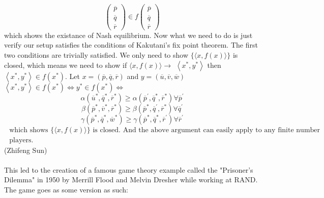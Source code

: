 \documentclass[12pt]{article}
\begin{document}
 	\[\left( \begin{array} { c } { \overline { p } } \\ { \overline { q } } \\ { \overline { r } } \end{array} \right) \in f \left( \begin{array} { c } { \overline { p } } \\ { \overline { q } } \\ { \overline { r } } \end{array} \right)\]
 	which shows the existance of Nash equilibrium. Now what we need to do is just verify our setup
 	satisfies the conditions of Kakutani's fix point theorem. The first two conditions are trivially
 	satisfied. We only need to show $\{ \langle x , f ( x ) \rangle \}$ is closed, which means we need to show if $\langle x , f ( x ) \rangle \rightarrow$ $\left\langle x ^ { * } , y ^ { * } \right\rangle$ then $\left\langle x ^ { * } , y ^ { * } \right\rangle \in f \left( x ^ { * } \right) .$ Let $x = ( \overline { p } , \overline { q } , \overline { r } )$ and $y = ( \overline { u } , \overline { v } , \overline { w } )$\\
 	$\left\langle x ^ { * } , y ^ { * } \right\rangle \in f \left( x ^ { * } \right) \Leftrightarrow y ^ { * } \in f \left( x ^ { * } \right) \Leftrightarrow$ \[\alpha \left( \overline { u } ^ { * } , \overline { q } ^ { * } , \overline { r } ^ { * } \right) \geq \alpha \left( \overline { p } ^ { \prime } , \overline { q } ^ { * } , \overline { r } ^ { * } \right) \forall \overline { p } ^ { \prime }\]
 	\[\beta \left( \overline { p } ^ { * } , \overline { v } ^ { * } , \overline { r } ^ { * } \right) \geq \beta \left( \overline { p } ^ { * } , \overline { q } ^ { \prime } , \overline { r } ^ { * } \right) \forall \overline { q } ^ { \prime }\]
 	\[	\gamma \left( \overline { p } ^ { * } , \overline { q } ^ { * } , \overline { w } ^ { * } \right) \geq \gamma \left( \overline { p } ^ { * } , \overline { q } ^ { * } , \overline { r } ^ { \prime } \right) \forall \overline { r } ^ { \prime }\]
$ 	\begin{array} { l } { \text { which shows } \{ \langle x , f ( x ) \rangle \} \text { is closed. And the above argument can easily apply to any finite number } } \\ { \text { players. } } \end{array} $\\
 	(Zhifeng Sun)\\
 	\\
 	This led to the creation of a famous game theory example called the "Prisoner's Dilemma" in 1950 by Merrill Flood and Melvin Dresher while working at RAND. The game goes as some version as such: \\
\end{document}
